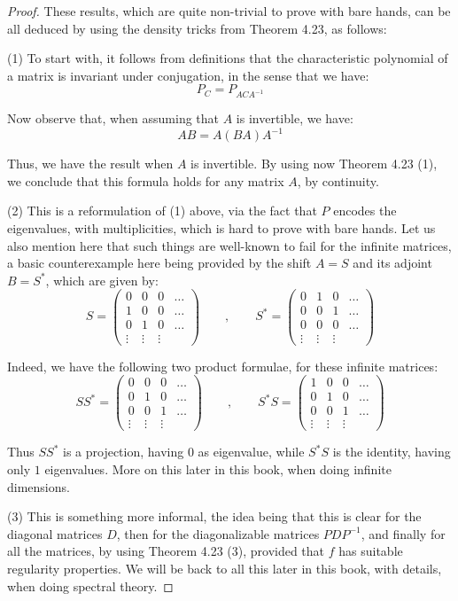\documentclass[12pt]{amsbook}
\begin{document}
\begin{proof}
These results, which are quite non-trivial to prove with bare hands, can be all deduced by using the density tricks from Theorem 4.23, as follows:

\medskip

(1) To start with, it follows from definitions that the characteristic polynomial of a matrix is invariant under conjugation, in the sense that we have:
$$P_C=P_{ACA^{-1}}$$

Now observe that, when assuming that $A$ is invertible, we have:
$$AB=A(BA)A^{-1}$$

Thus, we have the result when $A$ is invertible. By using now Theorem 4.23 (1), we conclude that this formula holds for any matrix $A$, by continuity. 

\medskip

(2) This is a reformulation of (1) above, via the fact that $P$ encodes the eigenvalues, with multiplicities, which is hard to prove with bare hands. Let us also mention here that such things are well-known to fail for the infinite matrices, a basic counterexample here being provided by the shift $A=S$ and its adjoint $B=S^*$, which are given by:
$$S=\begin{pmatrix}
0&0&0&\ldots\\
1&0&0&\ldots\\
0&1&0&\ldots\\
\vdots&\vdots&\vdots
\end{pmatrix}
\qquad,\qquad
S^*=\begin{pmatrix}
0&1&0&\ldots\\
0&0&1&\ldots\\
0&0&0&\ldots\\
\vdots&\vdots&\vdots
\end{pmatrix}$$

Indeed, we have the following two product formulae, for these infinite matrices:
$$SS^*=\begin{pmatrix}
0&0&0&\ldots\\
0&1&0&\ldots\\
0&0&1&\ldots\\
\vdots&\vdots&\vdots
\end{pmatrix}
\qquad,\qquad
S^*S=\begin{pmatrix}
1&0&0&\ldots\\
0&1&0&\ldots\\
0&0&1&\ldots\\
\vdots&\vdots&\vdots
\end{pmatrix}$$

Thus $SS^*$ is a projection, having $0$ as eigenvalue, while $S^*S$ is the identity, having only $1$ eigenvalues. More on this later in this book, when doing infinite dimensions.

\medskip

(3) This is something more informal, the idea being that this is clear for the diagonal matrices $D$, then for the diagonalizable matrices $PDP^{-1}$, and finally for all the matrices, by using Theorem 4.23 (3), provided that $f$ has suitable regularity properties. We will be back to all this later in this book, with details, when doing spectral theory.
\end{proof}
\end{document}
